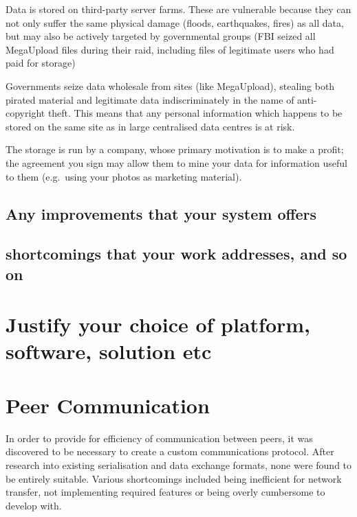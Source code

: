 \documentclass[12pt,a4paper,]{adreport}
\begin{document}
Data is stored on third-party server farms. These are vulnerable because
they can not only suffer the same physical damage (floods, earthquakes,
fires) as all data, but may also be actively targeted by governmental
groups (FBI seized all MegaUpload files during their raid, including
files of legitimate users who had paid for storage)

Governments seize data wholesale from sites (like MegaUpload), stealing
both pirated material and legitimate data indiscriminately in the name
of anti-copyright theft. This means that any personal information which
happens to be stored on the same site as in large centralised data
centres is at risk.

The storage is run by a company, whose primary motivation is to make a
profit; the agreement you sign may allow them to mine your data for
information useful to them (e.g.~using your photos as marketing
material).

\subsection{Any improvements that your system
offers}\label{any-improvements-that-your-system-offers}

\subsection{shortcomings that your work addresses, and so
on}\label{shortcomings-that-your-work-addresses-and-so-on}

\section{Justify your choice of platform, software, solution
etc}\label{justify-your-choice-of-platform-software-solution-etc}

\section{Peer Communication}\label{peer-communication}

In order to provide for efficiency of communication between peers, it
was discovered to be necessary to create a custom communications
protocol. After research into existing serialisation and data exchange
formats, none were found to be entirely suitable. Various shortcomings
included being inefficient for network transfer, not implementing
required features or being overly cumbersome to develop with.
\end{document}
